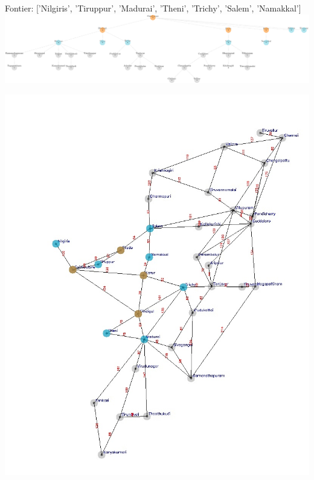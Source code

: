 \documentclass[xcolor=table]{beamer}
\begin{document}
\begin{frame}
  { \tiny Fontier: ['Nilgiris', 'Tiruppur', 'Madurai', 'Theni', 'Trichy', 'Salem', 'Namakkal'] }
  \includegraphics[width=1\textwidth]{../BFSNodes/6-1.png}
  \begin{center}
    \includegraphics[height=0.6\textheight]{../BFSoutput/tamilBFS4.jpg}
  \end{center}
\end{frame}
\end{document}
